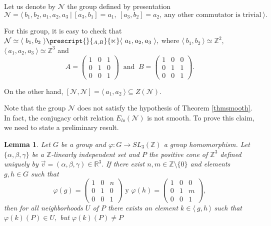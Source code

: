 \documentclass[12pt]{article}
\newtheorem{lem}{Lemma}
\theoremstyle{definition}
\begin{document}
Let us denote by $\mathcal{N}$ the group defined by presentation 
$$\mathcal{N}=\langle\ b_1,b_2,a_1,a_2,a_3\ |\ [a_3,b_1]=a_1,\ [a_3,b_2]=a_2,\ \text{any other commutator is trivial}\ \rangle.$$

For this group, it is easy to check that $\mathcal{N}\simeq\langle\ b_1,b_2\ \rangle\prescript{}{_{A,B}}{\ltimes}\langle\ a_1,a_2,a_3\ \rangle,$ where $\langle\ b_1,b_2\ \rangle\simeq\mathbb{Z}^2$, $\langle\ a_1,a_2,a_3\ \rangle\simeq\mathbb{Z}^3$ and
$$A=\left ( 
\begin{array}{ccc}
    1 & 0 & 1 \\
    0 &  1 & 0 \\
    0 & 0 & 1
\end{array}
\right )
\ \text{ and }\ 
B=\left ( 
\begin{array}{ccc}
    1 & 0 & 0 \\
    0 &  1 & 1 \\
    0 & 0 & 1
\end{array}
\right ).$$

On the other hand, $[\mathcal{N},\mathcal{N}]=\langle\ a_1,a_2\ \rangle\subseteq Z(\mathcal{N})$. 

Note that the group $\mathcal{N}$ does not satisfy the hypothesis of Theorem \ref{thmsmooth}. In fact, the conjugacy orbit relation $E_{lo}(\mathcal{N})$ is not smooth. 
To prove this claim, we need to state a preliminary result.

\begin{lem}
\label{lemavector}
    Let $G$ be a group and $\varphi:G\rightarrow SL_{3}(\mathbb{Z})$ a group homomorphism. Let $\{\alpha, \beta,\gamma\}$ be  a $\mathbb{Z}$-linearly independent set and $P$ the positive cone of $\mathbb{Z}^3$ defined uniquely by $\vec{v}=(\alpha,\beta, \gamma)\in \mathbb{R}^3.$ If there exist $n,m\in \mathbb{Z}\setminus\{0\}$ and elements $g,h\in G$ such that 
    $$\varphi(g)=
\left ( \begin{array}{ccc}
1 & 0 & n\\
0 & 1 & 0\\
0 & 0 & 1
\end{array}
\right )
\text{ y }
\varphi(h)= 
\left ( \begin{array}{ccc}
1 & 0 & 0\\
0 & 1 & m\\
0 & 0 & 1
\end{array}
\right ),$$
then for all neighborhoods $U$ of $P$ there exists an element $k\in \langle\ g,h\ \rangle $ such that $\varphi(k)(P)\in U,$ but $\varphi(k)(P)\neq P$
\end{lem}
\end{document}
